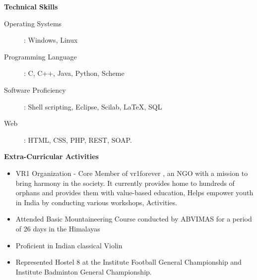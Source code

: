 \documentclass[a4paper,10pt]{article}
\newcommand{\resheading}[1]{
	{\large \colorbox{mygrey}{\begin{minipage}{\textwidth}{\textbf{#1 \vphantom{p\^{E}}}}\end{minipage}}}
}
\begin{document}
\resheading{Technical Skills}
\begin{description}
\item[Operating Systems] : Windows, Linux
\item[Programming Language]: C, C++, Java, Python, Scheme
\item[Software Proficiency]: Shell scripting, Eclipse, Scilab, LaTeX, SQL
\item[Web] : HTML, CSS, PHP, REST, SOAP.
\end{description}
	
\resheading{Extra-Curricular Activities}
	\begin{itemize}[label={--}]\itemsep -1pt
		\item VR1 Organization - Core Member of vr1forever , an NGO with a mission to bring harmony in the society. It currently provides home to hundreds of orphans and provides them with value-based education, Helps empower youth in India by conducting various workshops, Activities.
		\item Attended Basic Mountaineering Course conducted by ABVIMAS for a period of 26 days in the Himalayas
		\item Proficient in Indian classical Violin
		\item Represented Hostel 8 at the Institute Football General Championship and Institute Badminton General Championship.
	\end{itemize}
\end{document}
